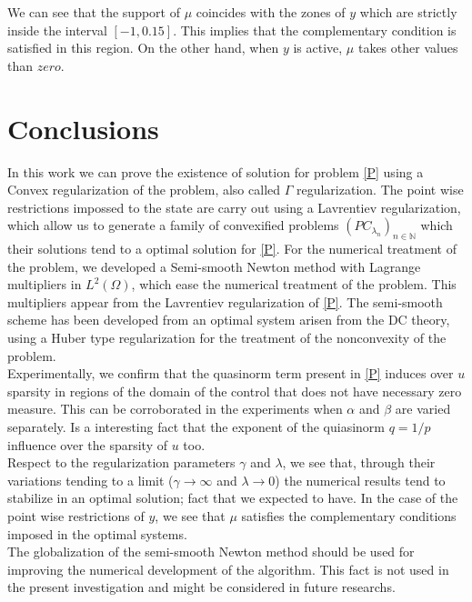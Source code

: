 \documentclass[11pt,a4paper]{amsart}
\newcommand{\om}{\Omega}
\begin{document}
We can see that the support of $\mu$ coincides with the zones of $y$ which are strictly inside the interval $[-1,0.15]$. This implies that the complementary condition is satisfied in this region. On the other hand, when $y$ is active, $\mu$ takes other values than $zero$.

\section{Conclusions}
In this work we can prove the existence of solution for problem \eqref{P} using a Convex regularization of the problem, also called $\Gamma$ regularization. The point wise restrictions impossed to the state are carry out using a Lavrentiev regularization, which allow us to generate a family of convexified problems $(PC_{\lambda_n})_{n\in \mathbb{N}}$ which their solutions tend to a optimal solution for \eqref{P}.  For the numerical treatment of the problem, we developed a Semi-smooth Newton method with Lagrange multipliers in $L^2(\om)$, which ease the numerical treatment of the problem. This multipliers appear from the Lavrentiev regularization of \eqref{P}. The semi-smooth scheme has been developed from an optimal system arisen from the DC theory, using a Huber type regularization for the treatment of the nonconvexity of the problem.\\

Experimentally, we confirm that the quasinorm term present in \eqref{P} induces over $u$ sparsity in regions of the domain of the control that does not have necessary zero measure. This can be corroborated in the experiments when $\alpha$ and $\beta$ are varied separately. Is a interesting fact that the exponent of the quiasinorm $q=1/p$ influence over the sparsity of $u$ too.\\

Respect to the regularization parameters $\gamma$ and $\lambda$, we see that, through their variations tending to a limit ($\gamma\to \infty$ and $\lambda\to 0$) the numerical results tend to stabilize in an optimal solution; fact that we expected to have. In the case of the point wise restrictions of $y$, we see that $\mu$ satisfies the complementary conditions imposed in the optimal systems.\\

The globalization of the semi-smooth Newton method should be used for improving the numerical development of the algorithm. This fact is not used in the present investigation and might be considered in future researchs.
\end{document}
